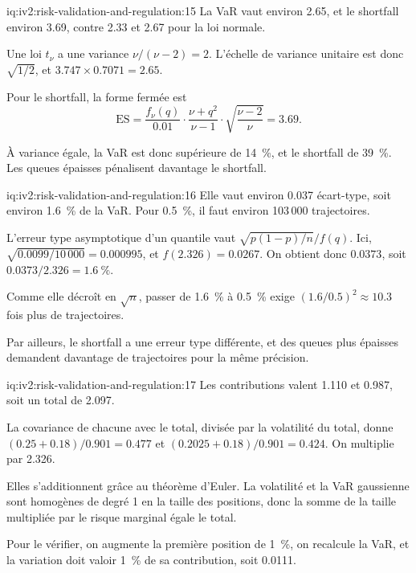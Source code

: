 \begin{solution}{iq:iv2:risk-validation-and-regulation:15}
La VaR vaut environ 2.65, et le shortfall environ 3.69, contre 2.33 et 2.67 pour la loi normale.

Une loi $t_\nu$ a une variance $\nu/(\nu - 2) = 2$. L'échelle de variance unitaire est donc $\sqrt{1/2}$, et $3.747 \times 0.7071 = 2.65$.

Pour le shortfall, la forme fermée est
\[
\mathrm{ES} = \frac{f_\nu(q)}{0.01}\cdot\frac{\nu + q^2}{\nu - 1}\cdot\sqrt{\frac{\nu - 2}{\nu}} = 3.69.
\]

À variance égale, la VaR est donc supérieure de 14~\%, et le shortfall de 39~\%. Les queues épaisses pénalisent davantage le shortfall.

\end{solution}

\begin{solution}{iq:iv2:risk-validation-and-regulation:16}
Elle vaut environ 0.037 écart-type, soit environ 1.6~\% de la VaR. Pour 0.5~\%, il faut environ 103\,000 trajectoires.

L'erreur type asymptotique d'un quantile vaut $\sqrt{p(1 - p)/n}/f(q)$. Ici, $\sqrt{0.0099/10\,000} = 0.000995$, et $f(2.326) = 0.0267$. On obtient donc $0.0373$, soit $0.0373/2.326 = 1.6~\%$.

Comme elle décroît en $\sqrt{n}$, passer de 1.6~\% à 0.5~\% exige $(1.6/0.5)^2 \approx 10.3$ fois plus de trajectoires.

Par ailleurs, le shortfall a une erreur type différente, et des queues plus épaisses demandent davantage de trajectoires pour la même précision.

\end{solution}

\begin{solution}{iq:iv2:risk-validation-and-regulation:17}
Les contributions valent 1.110 et 0.987, soit un total de 2.097.

La covariance de chacune avec le total, divisée par la volatilité du total, donne $(0.25 + 0.18)/0.901 = 0.477$ et $(0.2025 + 0.18)/0.901 = 0.424$. On multiplie par 2.326.

Elles s'additionnent grâce au théorème d'Euler. La volatilité et la VaR gaussienne sont homogènes de degré 1 en la taille des positions, donc la somme de la taille multipliée par le risque marginal égale le total.

Pour le vérifier, on augmente la première position de 1~\%, on recalcule la VaR, et la variation doit valoir 1~\% de sa contribution, soit 0.0111.

\end{solution}

